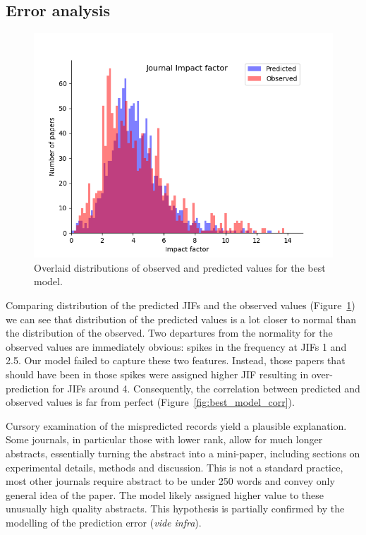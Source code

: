 \documentclass[11pt]{article}
\begin{document}
\subsection{Error analysis}
\begin{figure}
	\includegraphics[width= \columnwidth]{./Images/JIF_hist.png}
	\caption{Overlaid distributions of observed and predicted values for the best model.}
	\label{fig:JIF_hist}
\end{figure}

Comparing distribution of the predicted JIFs and the observed values (Figure~\ref{fig:JIF_hist}) we can see that distribution of the predicted values is a lot closer to normal than the distribution of the observed. Two departures from the normality for the observed values are immediately obvious: spikes in the frequency at JIFs 1 and 2.5. Our model failed to capture these two features. Instead, those papers that should have been in those spikes were assigned higher JIF resulting in over-prediction for JIFs around 4.  Consequently, the correlation between predicted and observed values is far from perfect (Figure~\ref{fig:best_model_corr}). 

Cursory examination of the mispredicted records yield a plausible explanation. Some journals, in particular those with lower rank, allow for much longer abstracts, essentially turning the abstract into a mini-paper, including sections on experimental details, methods and discussion. This is not a standard practice, most other journals require abstract to be under 250 words and convey only general idea of the paper. The model likely assigned higher value to these unusually high quality abstracts. This hypothesis is partially confirmed by the modelling of the prediction error (\textit{vide infra}).
\end{document}
